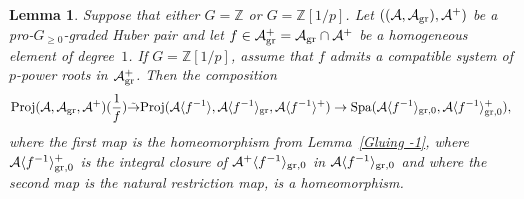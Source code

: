 \documentclass[12pt,twoside,a4paper]{article}
\newtheorem{lemma}[thm]{Lemma}
\theoremstyle{definition}
\theoremstyle{remark}
\newcommand\gr{{\rm gr}}
\newcommand\Proj{{\rm Proj}}
\newcommand\Spa{{\rm Spa}}
\begin{document}
\begin{lemma}\label{Gluing 0}Suppose that either $G=\mathbb{Z}$ or $G=\mathbb{Z}[1/p]$. Let $((\mathcal{A}, \mathcal{A}_{\gr}), \mathcal{A}^{+})$ be a pro-$G_{\geq0}$-graded Huber pair and let $f\in \mathcal{A}_{\gr}^{+}=\mathcal{A}_{\gr}\cap \mathcal{A}^{+}$ be a homogeneous element of degree~$1$. If $G=\mathbb{Z}[1/p]$, assume that $f$ admits a compatible system of $p$-power roots in $\mathcal{A}_{\gr}^{+}$. Then the composition \begin{equation*}\Proj(\mathcal{A}, \mathcal{A}_{\gr}, \mathcal{A}^{+})(\frac{1}{f})\tilde{\to} \Proj(\mathcal{A}\langle f^{-1}\rangle, \mathcal{A}\langle f^{-1}\rangle_{\gr}, \mathcal{A}\langle f^{-1}\rangle^{+}) \to \Spa(\mathcal{A}\langle f^{-1}\rangle_{\gr, 0}, \mathcal{A}\langle f^{-1}\rangle_{\gr, 0}^{+}),\end{equation*}where the first map is the homeomorphism from Lemma~\ref{Gluing -1}, where $\mathcal{A}\langle f^{-1}\rangle_{\gr, 0}^{+}$ is the integral closure of $\mathcal{A}^{+}\langle f^{-1}\rangle_{\gr, 0}$ in $\mathcal{A}\langle f^{-1}\rangle_{\gr, 0}$ and where the second map is the natural restriction map, is a homeomorphism.\end{lemma}
\end{document}
